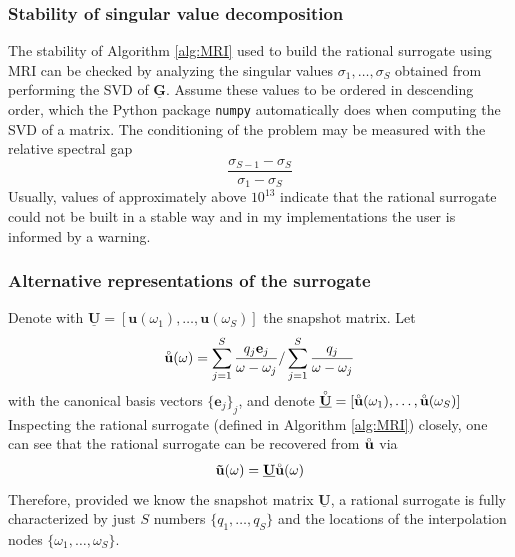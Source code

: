 \documentclass[11pt, a4paper]{article}
\begin{document}
\subsubsection{Stability of singular value decomposition}
\label{subsubsec:svd}
The stability of Algorithm \ref{alg:MRI} used to build the rational surrogate using \acrshort{MRI}
can be checked by analyzing the singular values $\sigma_1, \dots, \sigma_S$ 
obtained from performing the \acrshort{SVD} of $\mathbf{\underline{G}}$. Assume these values to be
ordered in descending order, which the Python package
\texttt{numpy} automatically does when computing the \acrshort{SVD} of a matrix. 
The conditioning of the problem may be measured with the relative
spectral gap \cite{davidePHD}
\begin{equation}
    \frac{\sigma_{S-1} - \sigma_S}{\sigma_1 - \sigma_S} \label{equ:spectral-gap}
\end{equation}
Usually, values of approximately above $10^{13}$ indicate that the rational surrogate could not
be built in a stable way and in my implementations the user is informed by a warning.

\subsubsection{Alternative representations of the surrogate}
\label{subsubsec:u-ring}
Denote with $\mathbf{\underline{U}} = [\mathbf{u}(\omega_1), \dots, \mathbf{u}(\omega_S)]$
the snapshot matrix. Let 
\begin{equation}
    \accentset{\circ}{\mathbf{u}}(\omega) = \sum_{j=1}^S \frac{q_j \mathbf{e}_j}{\omega - \omega_j}
    / \sum_{j=1}^S \frac{q_j}{\omega - \omega_j} \label{equ:u-ring}
\end{equation}
with the canonical basis vectors $\{ \mathbf{e}_j \}_j$, and denote
$\accentset{\circ}{\mathbf{\underline{U}}} = [\accentset{\circ}{\mathbf{u}}(\omega_1), \dots, \accentset{\circ}{\mathbf{u}}(\omega_S)]$
Inspecting the rational surrogate (defined in Algorithm \ref{alg:MRI}) closely,
one can see that the rational surrogate can be recovered from $\accentset{\circ}{\mathbf{u}}$
via
\begin{equation}
    \mathbf{\tilde{u}}(\omega) = \mathbf{\underline{U}} \accentset{\circ}{\mathbf{u}}(\omega)
\end{equation}
Therefore, provided we know the snapshot matrix $\mathbf{\underline{U}}$, a rational surrogate is
fully characterized by just $S$ numbers $\{q_1, \dots, q_S\}$
and the locations of the interpolation nodes $\{\omega_1, \dots, \omega_S\}$.
\end{document}

